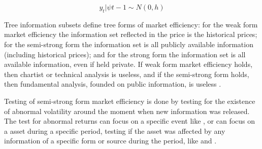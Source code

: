 \documentclass[a4paper]{article}
\begin{document}
\begin{equation}
\label{eqn:efficient}
y_t | \psi{t-1} \sim N(0,h)
\end{equation}



Tree information subsets define tree forms of market efficiency: for the weak form market efficiency the information set reflected in the price is the historical prices; for the semi-strong form the information set is all publicly available information (including historical prices); and for the strong form the information set is all available information, even if held private. If weak form market efficiency holds, then chartist or technical analysis is useless, and if the semi-strong form holds, then fundamental analysis, founded on public information, is useless \citet{oprean2012}.

Testing of semi-strong form market efficiency is done by testing for the existence of abnormal volatility around the moment when new information was released. The test for abnormal returns can focus on a specific event like \citet{gabrielribeiro2013}, or can focus on a asset during a specific period, testing if the asset was affected by any information of a specific form or source during the period, like \citet{larsenthorsrud2017} and \citet{caporaleetal2015}.
\end{document}
